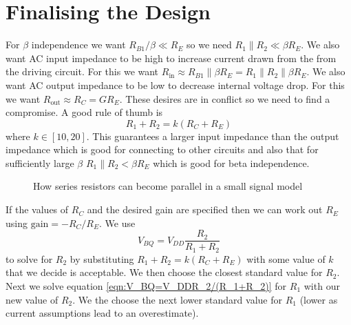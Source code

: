 \documentclass{article}
\begin{document}
    \section{Finalising the Design}
    For \(\beta\) independence we want \(R_{B1}/\beta \ll R_E\) so we need \(R_1\parallel R_2\ll \beta R_E\).
    We also want AC input impedance to be high to increase current drawn from the from the driving circuit. 
    For this we want \(R_\text{in}\approx R_{B1}\parallel \beta R_E = R_1\parallel R_2\parallel \beta R_E\).
    We also want AC output impedance to be low to decrease internal voltage drop.
    For this we want \(R_\text{out}\approx R_C = GR_E\).
    These desires are in conflict so we need to find a compromise.
    A good rule of thumb is
    \[R_1 + R_2 = k(R_C + R_E)\]
    where \(k\in[10,20]\). 
    This guarantees a larger input impedance than the output impedance which is good for connecting to other circuits and also that for sufficiently large \(\beta\) \(R_1\parallel R_2 < \beta R_E\) which is good for beta independence.
    
    \begin{figure}[ht]
        \centering
        \caption{How series resistors can become parallel in a small signal model}
    \end{figure}
    
    If the values of \(R_C\) and the desired gain are specified then we can work out \(R_E\) using \(\text{gain} = -R_C/R_E\).
    We use
    \begin{equation}\label{eqn:V_BQ=V_DDR_2/(R_1+R_2)}
        V_{BQ} = V_{DD}\frac{R_2}{R_1 + R_2}
    \end{equation}
    to solve for \(R_2\) by substituting \(R_1 + R_2 = k(R_C + R_E)\) with some value of \(k\) that we decide is acceptable.
    We then choose the closest standard value for \(R_2\). Next we solve equation \ref{eqn:V_BQ=V_DDR_2/(R_1+R_2)} for \(R_1\) with our new value of \(R_2\).
    We the choose the next lower standard value for \(R_1\) (lower as current assumptions lead to an overestimate).
    
\end{document}
